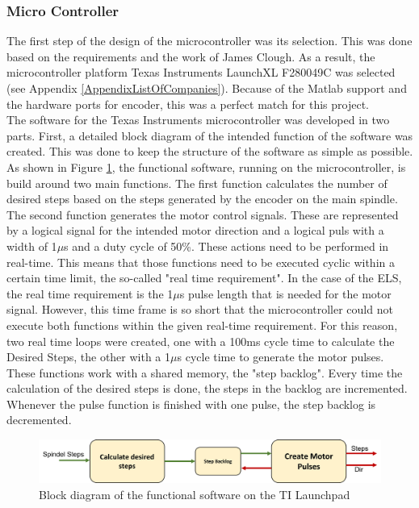 \subsubsection{Micro Controller}
The first step of the design of the microcontroller was its selection. This was done based on the requirements and the work of James Clough. As a result, the microcontroller platform Texas Instruments LaunchXL F280049C was selected (see Appendix \ref{AppendixListOfCompanies}). Because of the Matlab support and the hardware ports for encoder, this was a perfect match for this project.\\
The software for the Texas Instruments microcontroller was developed in two parts. First, a detailed block diagram of the intended function of the software was created. This was done to keep the structure of the software as simple as possible. As shown in Figure \ref{MicroContBlockDia}, the functional software, running on the microcontroller, is build around two main functions. The first function calculates the number of desired steps based on the steps generated by the encoder on the main spindle. The second function generates the motor control signals. These are represented by a logical signal for the intended motor direction and a logical puls with a width of 1$\mu$s and a duty cycle of 50\%. These actions need to be performed in real-time. This means that those functions need to be executed cyclic within a certain time limit, the so-called "real time requirement". In the case of the ELS, the real time requirement is the 1$\mu$s pulse length that is needed for the motor signal. However, this time frame is so short that the microcontroller could not execute both functions within the given real-time requirement. For this reason, two real time loops were created, one with a 100ms cycle time to calculate the Desired Steps, the other with a 1$\mu$s cycle time to generate the motor pulses. These functions work with a shared memory, the "step backlog". Every time the calculation of the desired steps is done, the steps in the backlog are incremented. Whenever the pulse function is finished with one pulse, the step backlog is decremented.\\
 
 
\begin{figure}
    \begin{center}
    \includegraphics[width=12cm]{Pictures/MicroContBlockDia.png}
    \caption[Block diagram of the functional software on the TI Launchpad]{Block diagram of the functional software on the TI Launchpad}
    \label{MicroContBlockDia}
    \end{center}
\end{figure}
 
